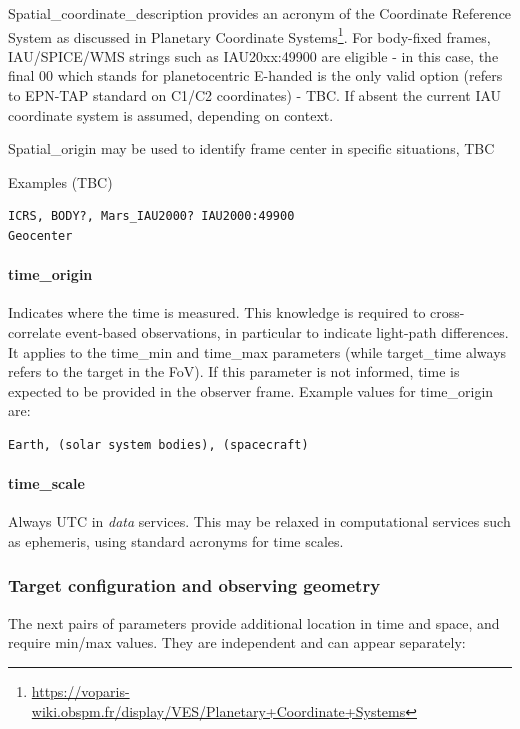 \documentclass[11pt,a4paper]{ivoa}
\begin{document}
Spatial\_coordinate\_description provides an acronym of the Coordinate Reference System as discussed in Planetary Coordinate Systems\footnote{\url{https://voparis-wiki.obspm.fr/display/VES/Planetary+Coordinate+Systems}}. For body-fixed frames, IAU/SPICE/WMS strings such as IAU20xx:49900 are eligible - in this case, the final 00 which stands for planetocentric E-handed is the only valid option (refers to EPN-TAP standard on C1/C2 coordinates) - TBC. If absent the current IAU coordinate system is assumed, depending on context. 

Spatial\_origin may be used to identify frame center in specific situations, TBC

Examples (TBC)

\begin{verbatim}
ICRS, BODY?, Mars_IAU2000? IAU2000:49900
Geocenter
\end{verbatim}

\paragraph{time\_origin}

Indicates where the time is measured. This knowledge is required to cross-correlate event-based observations, in particular to indicate light-path differences. It applies to the time\_min and time\_max parameters (while target\_time always refers to the target in the FoV). If this parameter is not informed, time is expected to be provided in the observer frame. Example values for time\_origin are:

\begin{verbatim}
Earth, (solar system bodies), (spacecraft)
\end{verbatim}

\paragraph{time\_scale}

Always UTC in \emph{data} services. This may be relaxed in computational services such as ephemeris, using standard acronyms for time scales.

\subsubsection{Target configuration and observing geometry}

The next pairs of parameters provide additional location in time and space, and require min/max values. They are independent and can appear separately:
\end{document}
